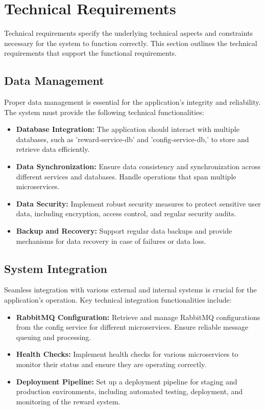 \section{Technical Requirements}
Technical requirements specify the underlying technical aspects and constraints necessary for the system to function correctly. This section outlines the technical requirements that support the functional requirements.

\subsection{Data Management}
Proper data management is essential for the application's integrity and reliability. The system must provide the following technical functionalities:

\begin{itemize}
    \item \textbf{Database Integration:} The application should interact with multiple databases, such as 'reward-service-db' and 'config-service-db,' to store and retrieve data efficiently.
    \item \textbf{Data Synchronization:} Ensure data consistency and synchronization across different services and databases. Handle operations that span multiple microservices.
    \item \textbf{Data Security:} Implement robust security measures to protect sensitive user data, including encryption, access control, and regular security audits.
    \item \textbf{Backup and Recovery:} Support regular data backups and provide mechanisms for data recovery in case of failures or data loss.
\end{itemize}

\subsection{System Integration}
Seamless integration with various external and internal systems is crucial for the application's operation. Key technical integration functionalities include:

\begin{itemize}
    \item \textbf{RabbitMQ Configuration:} Retrieve and manage RabbitMQ configurations from the config service for different microservices. Ensure reliable message queuing and processing.
    \item \textbf{Health Checks:} Implement health checks for various microservices to monitor their status and ensure they are operating correctly.
    \item \textbf{Deployment Pipeline:} Set up a deployment pipeline for staging and production environments, including automated testing, deployment, and monitoring of the reward system.
\end{itemize}

